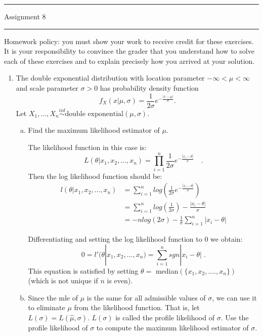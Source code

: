 \documentclass[letterpaper,12pt,fleqn]{article}
\begin{document}
\pagestyle{empty}

\hrule \vspace{0.5em}
 \hfill Assignment 8 \newline \hrule

\vspace{1em}

Homework policy: you must show your work to receive credit for these exercises.  It is your responsibility to convince the grader that you understand how to solve each of these exercises and to explain precisely how you arrived at your solution.

\vspace{1em}

\begin{enumerate}

\item The double exponential distribution with location parameter $-\infty < \mu < \infty$ and scale parameter $\sigma > 0$ has probability density function
\begin{equation*}
f_{X}(x | \mu, \sigma) = \frac{1}{2 \sigma} e^{-\frac{|x - \mu|}{\sigma}}.
\end{equation*}
Let $X_{1}, \dots, X_{n} \overset{iid}{\sim} \mbox{double exponential}(\mu, \sigma)$.

\begin{enumerate}[(a)]
\item Find the maximum likelihood estimator of $\mu$.

The likelihood function in this case is:
$$L(\theta | x_1, x_2,...,x_n) = \prod_{i = 1}^{n} \frac{1}{2\sigma} e^{-\frac{|x_i- \theta |}{\sigma}} \quad .$$
Then the log likelihood function should be:
\begin{align*}
l(\theta | x_1,x_2,...,x_n) &= \sum_{i=1}^{n} log \left(\frac{1}{2\sigma}e^{-\frac{|x_i- \theta |}{\sigma}} \right)\\
&= \sum_{i=1}^{n} log(\frac{1}{2\sigma}) - \frac{|x_i-\theta|}{\sigma} \\
&= -nlog(2\sigma) - \frac{1}{\sigma} \sum_{i=1}^{n} |x_i - \theta|
\end{align*}

Differentiating and setting the log likelihood function to $0$ we obtain: $$0 = l'(\theta | x_1,x_2,...,x_n) = \sum_{i=1}^{n} sgn|x_i - \theta | \; .$$ 
This equation is satisfied by setting $\theta = $ median$(\{x_1,x_2,....,x_n\})$ (which is not unique if $n$ is even). 
\item Since the mle of $\mu$ is the same for all admissible values of $\sigma$, we can use it to eliminate $\mu$ from the likelihood function.  That is, let $L(\sigma) = L(\hat{\mu}, \sigma)$.  $L(\sigma)$ is called the profile likelihood of $\sigma$. Use the profile likelihood of $\sigma$ to compute the maximum likelihood estimator of $\sigma$.


\end{enumerate}
\end{enumerate}
\end{document}
